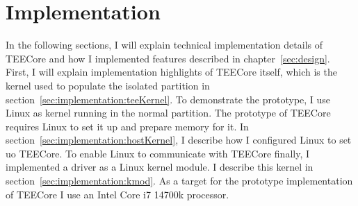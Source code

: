 \chapter{Implementation}
\label{sec:implementation}


In the following sections, I will explain technical implementation details
of TEECore and how I implemented features described in chapter~\ref{sec:design}.
First, I will explain implementation highlights of TEECore itself, which is
the kernel used to populate the isolated partition in
section~\ref{sec:implementation:teeKernel}. To demonstrate the prototype, I use
Linux as kernel running in the normal partition. The prototype of TEECore
requires Linux to set it up and prepare memory for it. In
section~\ref{sec:implementation:hostKernel}, I describe how I configured Linux
to set uo TEECore. To enable Linux to communicate with TEECore finally, I
implemented a driver as a Linux kernel module. I describe this kernel in
section~\ref{sec:implementation:kmod}. As a target for the prototype implementation of TEECore I use an
Intel Core i7 14700k processor.

